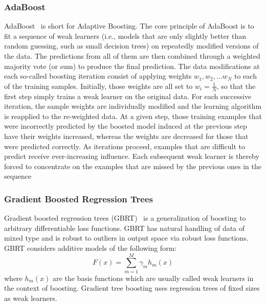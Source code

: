 \subsubsection{AdaBoost}
\label{ssub:adaboost}
AdaBoost~\cite{collins2002} is short for Adaptive Boosting.
The core principle of AdaBoost is to fit a sequence of weak learners (i.e., models that are only slightly better than random guessing, such as small decision trees) on repeatedly modified versions of the data. 
The predictions from all of them are then combined through a weighted majority vote (or sum) to produce the final prediction. 
The data modifications at each so-called boosting iteration consist of applying weights $w_1, w_2, \ldots w_N$ to each of the training samples. 
Initially, those weights are all set to $w_i = \frac{1}{N}$, so that the first step simply trains a weak learner on the original data. 
For each successive iteration, the sample weights are individually modified and the learning algorithm is reapplied to the re-weighted data. 
At a given step, those training examples that were incorrectly predicted by the boosted model induced at the previous step have their weights increased, whereas the weights are decreased for those that were predicted correctly. 
As iterations proceed, examples that are difficult to predict receive ever-increasing influence. 
Each subsequent weak learner is thereby forced to concentrate on the examples that are missed by the previous ones in the sequence

\subsubsection{Gradient Boosted Regression Trees}
\label{ssub:gradient_boost}
Gradient boosted regression trees (GBRT)~\cite{friedman2001} is a generalization of boosting to arbitrary differentiable loss functions.
GBRT has natural handling of data of mixed type and is robust to outliers in output space via robust loss functions.
GBRT considers additive models of the following form:
\begin{equation}
	F(x) = \sum\limits_{m=1}^{M} \gamma_m h_m(x)
\end{equation}
where $h_m(x)$ are the basis functions which are usually called weak learners in the context of boosting.
Gradient tree boosting uses regression trees of fixed sizes as weak learners.

